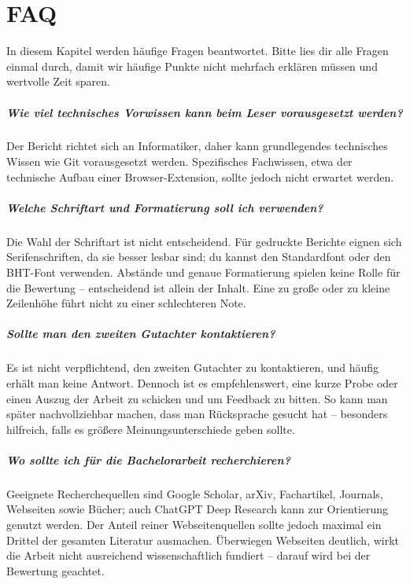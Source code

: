\chapter{FAQ}
In diesem Kapitel werden häufige Fragen beantwortet.  Bitte lies dir alle Fragen einmal durch, damit wir häufige Punkte nicht mehrfach erklären müssen und wertvolle Zeit sparen.

\paragraph{Wie viel technisches Vorwissen kann beim Leser vorausgesetzt werden?}
Der Bericht richtet sich an Informatiker, daher kann grundlegendes technisches Wissen wie Git vorausgesetzt werden. Spezifisches Fachwissen, etwa der technische Aufbau einer Browser-Extension, sollte jedoch nicht erwartet werden.

\paragraph{Welche Schriftart und Formatierung soll ich verwenden?}
Die Wahl der Schriftart ist nicht entscheidend. Für gedruckte Berichte eignen sich Serifenschriften, da sie besser lesbar sind; du kannst den Standardfont oder den BHT-Font verwenden. Abstände und genaue Formatierung spielen keine Rolle für die Bewertung – entscheidend ist allein der Inhalt. Eine zu große oder zu kleine Zeilenhöhe führt nicht zu einer schlechteren Note.

\paragraph{Sollte man den zweiten Gutachter kontaktieren?}
Es ist nicht verpflichtend, den zweiten Gutachter zu kontaktieren, und häufig erhält man keine Antwort. Dennoch ist es empfehlenswert, eine kurze Probe oder einen Auszug der Arbeit zu schicken und um Feedback zu bitten. So kann man später nachvollziehbar machen, dass man Rücksprache gesucht hat – besonders hilfreich, falls es größere Meinungsunterschiede geben sollte.

\paragraph{Wo sollte ich für die Bachelorarbeit recherchieren?}
Geeignete Recherchequellen sind Google Scholar, arXiv, Fachartikel, Journals, Webseiten sowie Bücher; auch ChatGPT Deep Research kann zur Orientierung genutzt werden. Der Anteil reiner Webseitenquellen sollte jedoch maximal ein Drittel der gesamten Literatur ausmachen. Überwiegen Webseiten deutlich, wirkt die Arbeit nicht ausreichend wissenschaftlich fundiert – darauf wird bei der Bewertung geachtet.

